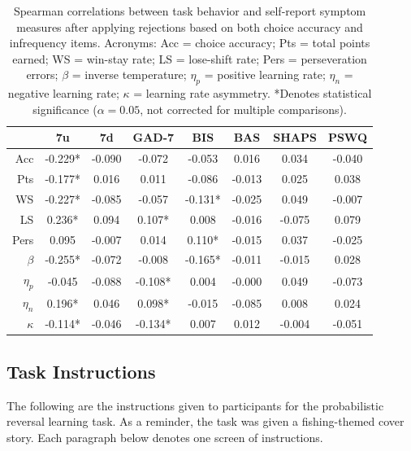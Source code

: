 \documentclass[a4paper,notitlepage,12pt]{article}
\begin{document}
\begin{refsection}[supp]
\begin{table}[H]
\centering
\small
\begin{tabular}{rccccccc}
\toprule
{} &       7u &      7d &    GAD-7 &      BIS &     BAS &   SHAPS &    PSWQ \\
\midrule
Acc      &  -0.229* &  -0.090 &   -0.072 &   -0.053 &   0.016 &   0.034 &  -0.040 \\
Pts      &  -0.177* &   0.016 &    0.011 &   -0.086 &  -0.013 &   0.025 &   0.038 \\
WS       &  -0.227* &  -0.085 &   -0.057 &  -0.131* &  -0.025 &   0.049 &  -0.007 \\
LS       &   0.236* &   0.094 &   0.107* &    0.008 &  -0.016 &  -0.075 &   0.079 \\
Pers     &    0.095 &  -0.007 &    0.014 &   0.110* &  -0.015 &   0.037 &  -0.025 \\
$\beta$  &  -0.255* &  -0.072 &   -0.008 &  -0.165* &  -0.011 &  -0.015 &   0.028 \\
$\eta_p$ &   -0.045 &  -0.088 &  -0.108* &    0.004 &  -0.000 &   0.049 &  -0.073 \\
$\eta_n$ &   0.196* &   0.046 &   0.098* &   -0.015 &  -0.085 &   0.008 &   0.024 \\
$\kappa$ &  -0.114* &  -0.046 &  -0.134* &    0.007 &   0.012 &  -0.004 &  -0.051 \\
\bottomrule
\end{tabular}
\captionsetup{width=0.88\textwidth}
\caption{Spearman correlations between task behavior and self-report symptom measures after applying rejections based on both choice accuracy and infrequency items. Acronyms: Acc = choice accuracy; Pts = total points earned; WS = win-stay rate; LS = lose-shift rate; Pers = perseveration errors; $\beta$ = inverse temperature; $\eta_p$ = positive learning rate; $\eta_n$ = negative learning rate; $\kappa$ = learning rate asymmetry. *Denotes statistical significance ($\alpha=0.05$, not corrected for multiple comparisons).}
\end{table}

\subsection*{Task Instructions}

The following are the instructions given to participants for the probabilistic reversal learning task. As a reminder, the task was given a fishing-themed cover story. Each paragraph below denotes one screen of instructions.


\end{refsection}
\end{document}
